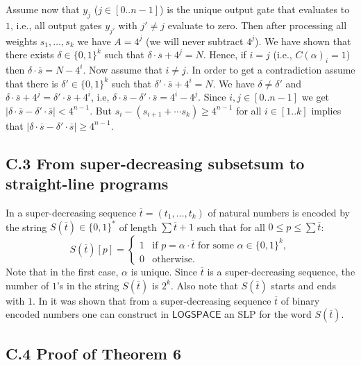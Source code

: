 \documentclass[10pt,a4paper]{article}
\newcommand{\ccinterval}[2]{[{#1}..{#2}]}
\newcommand{\cointerval}[2]{[{#1}..{#2}-1]}
\renewcommand{\L}{\ensuremath{\mathsf{LOGSPACE}}\xspace}
\begin{document}
Assume now that $y_j$ ($j \in \cointerval{0}{n}$) is the unique output gate that evaluates to $1$, i.e., all
output gates $y_{j'}$ with $j' \neq j$ evaluate to zero. Then after processing all weights
$s_1,\ldots,s_k$ we have $A = 4^j$ (we will never subtract $4^j$). We have shown that there exists
$\delta \in \{0,1\}^k$ such that $\delta \cdot \overline{s} + 4^j = N$. Hence, if $i=j$ (i.e., $C(\alpha)_i = 1$)
then  $\delta \cdot \overline{s} = N-4^i$. Now assume that $i \neq j$. In order to get a contradiction assume 
that there is $\delta' \in \{0,1\}^k$ such that $\delta' \cdot \overline{s} + 4^i = N$. We have $\delta \neq \delta'$ and 
$\delta \cdot \overline{s} + 4^j  = \delta' \cdot \overline{s} + 4^i$, i.e, $\delta \cdot \overline{s} - \delta' \cdot \overline{s} = 4^i - 4^j$.
Since $i,j \in \cointerval{0}{n}$ we get $|\delta \cdot \overline{s} - \delta' \cdot \overline{s}| < 4^{n-1}$. But 
$s_i - (s_{i+1} + \cdots s_k) \geq 4^{n-1}$ for all $i \in \ccinterval{1}{k}$ implies that 
$|\delta \cdot \overline{s} - \delta' \cdot \overline{s}| \ge 4^{n-1}$.

\subsection*{C.3 From super-decreasing subsetsum to straight-line programs} \label{sec-subsetsum-SLP}

In \cite{ref35} a super-decreasing sequence $\overline{t} = (t_1,\ldots,t_k)$ of natural numbers is encoded by the string 
$S(\overline{t}) \in \{0,1\}^*$ of length $\sum \overline{t} +1$
such that for all $0 \leq p \leq \sum \overline{t}$:
\begin{equation}\label{main string}
S(\overline{t})[p] = \begin{cases} 1 & \text{if $p = \alpha \cdot \overline{t}$ for some $\alpha  \in \{0,1\}^k$}, \\
0 & \text{otherwise}.
\end{cases}
\end{equation}
Note that in the first case, $\alpha$ is unique.
Since $\overline{t}$ is a super-decreasing sequence, 
the number of $1$'s in the string $S(\overline{t})$ is $2^k$.
Also note that $S(\overline{t})$ starts and ends with $1$.
In \cite{ref35} it was shown that from a super-decreasing sequence $\overline{t}$
of binary encoded numbers one can construct in \L an SLP for 
the word $S(\overline{t})$.



   
\subsection*{C.4 Proof of Theorem 6} \label{sec:leaf-wreath}
\end{document}

